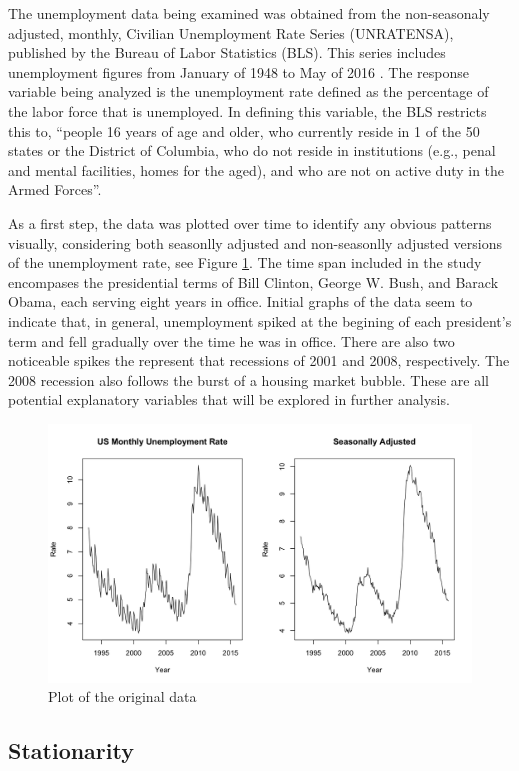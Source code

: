 {		The unemployment data being examined was obtained from the non-seasonaly adjusted, monthly, Civilian Unemployment Rate Series (UNRATENSA), published by the Bureau of Labor Statistics (BLS).  This series includes unemployment figures from January of 1948 to  May of 2016 \citep{blsref}.  The response variable being analyzed is the unemployment rate defined as the percentage of the labor force that is unemployed.  In defining this variable, the BLS restricts this to, ``people 16 years of age and older, who currently reside in 1 of the 50 states or the District of Columbia, who do not reside in institutions (e.g., penal and mental facilities, homes for the aged), and who are not on active duty in the Armed Forces''. \newline
		
		As a first step, the data was plotted over time to identify any obvious patterns visually, considering both seasonlly adjusted and non-seasonlly adjusted versions of the unemployment rate, see Figure \ref{fig:unemployment}.  The time span included in the study encompases the presidential terms of Bill Clinton, George W. Bush, and Barack Obama, each serving eight years in office.  Initial graphs of the data seem to indicate that, in general, unemployment spiked at the begining of each president's term and fell gradually over the time he was in office. There are also two noticeable spikes the represent that recessions of 2001 and 2008, respectively.  The 2008 recession also follows the burst of a housing market bubble.  These are all potential explanatory variables that will be explored in further analysis.
		\begin{figure}[H]
			\centering
			\caption{Plot of the original data}
			\label{fig:unemployment}
			\includegraphics[width=.7\textwidth]{images/Unemployment}
		\end{figure}
		
		\subsection*{Stationarity}
						
}
